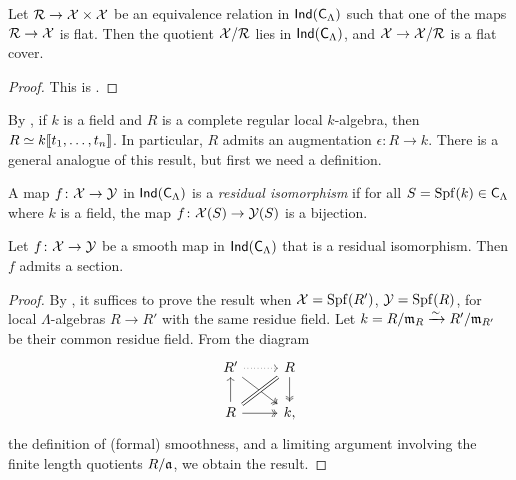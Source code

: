 \documentclass[phd,cornellheadings,draft]{cornell}
\begin{document}
\begin{theorem}\label{thm:quotients-ind}
Let $\mathcal{R}\to \mathcal{X}\times \mathcal{X}$ be an equivalence relation in 
$\operatorname{\mathsf{Ind}}(\mathsf{C}_\Lambda)$ such that one of the maps $\mathcal{R}\to \mathcal{X}$ is 
flat. Then the quotient $\mathcal{X}/\mathcal{R}$ lies in $\operatorname{\mathsf{Ind}}(\mathsf{C}_\Lambda)$, and 
$\mathcal{X}\to \mathcal{X}/\mathcal{R}$ is a flat cover. 
\end{theorem}
\begin{proof}
This is \cite[VII\textsubscript{B} 1.4]{sga3-1}. 
\end{proof}

By \cite[29.7]{matsumura-1989}, if $k$ is a field and $R$ is a complete regular 
local $k$-algebra, then $R\simeq k\llbracket t_1,\dots,t_n \rrbracket$. In particular, $R$ 
admits an augmentation $\epsilon\colon R\to k$. There is a general analogue of 
this result, but first we need a definition. 

\begin{definition}
A map $f\colon \mathcal{X}\to \mathcal{Y}$ in $\operatorname{\mathsf{Ind}}(\mathsf{C}_\Lambda)$ is a 
\emph{residual isomorphism} if for all $S=\operatorname{Spf}(k)\in \mathsf{C}_\Lambda$ where 
$k$ is a field, the map $f\colon \mathcal{X}(S)\to \mathcal{Y}(S)$ is a bijection. 
\end{definition}

\begin{lemma}\label{thm:smooth-section}
Let $f\colon \mathcal{X}\to \mathcal{Y}$ be a smooth map in $\operatorname{\mathsf{Ind}}(\mathsf{C}_\Lambda)$ 
that is a residual isomorphism. Then $f$ admits a section. 
\end{lemma}
\begin{proof}
By \cite[VII\textsubscript{B} 0.1.1]{sga3-1}, it suffices to prove the result 
when $\mathcal{X}=\operatorname{Spf}(R')$, $\mathcal{Y}=\operatorname{Spf}(R)$, for local $\Lambda$-algebras $R\to R'$ 
with the same residue field. Let $k=R/\mathfrak{m}_R \xrightarrow\sim R'/\mathfrak{m}_{R'}$ be their common 
residue field. From the diagram 
\[
\begin{tikzcd}
	R' \ar[r, dotted] \ar[dr, two heads]
		& R \ar[d, two heads] \\
	R \ar[u] \ar[ur, equal] \ar[r, two heads]
		& k ,
\end{tikzcd}
\]
the definition of (formal) smoothness, and a limiting argument involving the 
finite length quotients $R/\mathfrak{a}$, we obtain the result. 
\end{proof}
\end{document}
